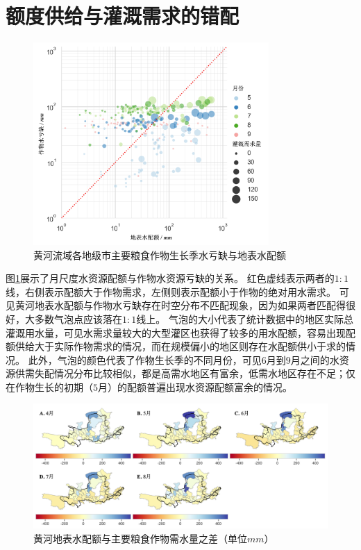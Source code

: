 
\section{额度供给与灌溉需求的错配}

\begin{figure}[htb]
    \centering
    \includegraphics[width=0.8\textwidth]{img/ch6/ch6_matches.png}
    \caption{黄河流域各地级市主要粮食作物生长季水亏缺与地表水配额}\label{ch6:fig:matches}
\end{figure}

图\ref{ch6:fig:matches}展示了月尺度水资源配额与作物水资源亏缺的关系。
红色虚线表示两者的$1:1$线，右侧表示配额大于作物需求，左侧则表示配额小于作物的绝对用水需求。
可见黄河地表水配额与作物水亏缺存在时空分布不匹配现象，因为如果两者匹配得很好，大多数气泡点应该落在$1:1$线上。
气泡的大小代表了统计数据中的地区实际总灌溉用水量，可见水需求量较大的大型灌区也获得了较多的用水配额，容易出现配额供给大于实际作物需求的情况，而在规模偏小的地区则存在水配额供小于求的情况。
此外，气泡的颜色代表了作物生长季的不同月份，可见$6$月到$9$月之间的水资源供需失配情况分布比较相似，都是高需水地区有富余，低需水地区存在不足；仅在作物生长的初期（$5$月）的配额普遍出现水资源配额富余的情况。

\begin{figure}[htb]
    \centering
    \includegraphics[width=\textwidth]{img/ch6/ch6_deficits_map.png}
    \caption[黄河地表水配额与主要粮食作物需水量之差]{黄河地表水配额与主要粮食作物需水量之差（单位$mm$）}\label{ch6:fig:deficits_maps}
\end{figure}

